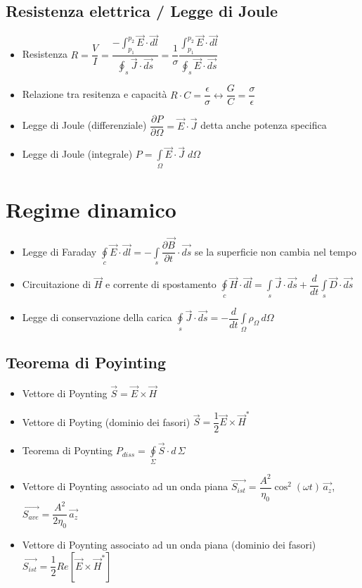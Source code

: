 \documentclass{article}
\begin{document}
\subsection{Resistenza elettrica / Legge di Joule}
\begin{itemize}
	\item Resistenza \(\displaystyle  R = \dfrac{V}{I} = \dfrac{\displaystyle-\int_{p_1}^{p_2} \vec{E} \cdot \vec{dl}}{\displaystyle\oint_s \vec{J} \cdot \vec{ds}} = \dfrac{1}{\sigma} \dfrac{\displaystyle\int_{p_1}^{p_2} \vec{E} \cdot \vec{dl}}{\displaystyle \oint_s \vec{E} \cdot \vec{ds}} \)
	\item Relazione tra resitenza e capacità \(R \cdot C = \dfrac{\epsilon}{\sigma} \leftrightarrow \dfrac{G}{C} = \dfrac{\sigma}{\epsilon} \)
	\item Legge di Joule (differenziale) \( \dfrac{\partial P}{\partial \Omega} = \vec{E} \cdot \vec{J} \) detta anche potenza specifica
	\item Legge di Joule (integrale) \(\displaystyle P = \int\limits_\Omega \vec{E} \cdot \vec{J} \; d\Omega \)
\end{itemize}

\newpage

\section{Regime dinamico}
\begin{itemize}
	\item Legge di Faraday \(\displaystyle \oint\limits_c \vec{E} \cdot \vec{dl} = - \int\limits_s \dfrac{\partial \vec{B}}{\partial t} \cdot \vec{ds} \) se la superficie non cambia nel tempo
	\item Circuitazione di \( \vec{H} \) e corrente di spostamento \(\displaystyle \oint\limits_c \vec{H} \cdot \vec{dl} = \int\limits_s \vec{J} \cdot \vec{ds} + \dfrac{d}{dt} \int\limits_s \vec{D} \cdot \vec{ds} \)
	\item Legge di conservazione della carica \(\displaystyle \oint\limits_s \vec{J} \cdot \vec{ds} = -\dfrac{d}{dt} \int\limits_\Omega \rho_\Omega \, d\Omega \)
\end{itemize}

\subsection{Teorema di Poyinting}
\begin{itemize}
	\item Vettore di Poynting \( \vec{S} = \vec{E} \times \vec{H} \)
	\item Vettore di Poyting (dominio dei fasori) \( \vec{S} = \dfrac{1}{2} \vec{E} \times \vec{H}^{*} \)
	\item Teorema di Poynting \( P_{diss} = \oint\limits_\Sigma \vec{S} \cdot d \,\Sigma \)
	\item Vettore di Poynting associato ad un onda piana \( \vec{S_{ist}} = \dfrac{A^2}{\eta_0} \cos^2{(\omega t)} \, \vec{a_z} \), \( \vec{S_{ave}} = \dfrac{A^2}{2 \eta_0} \, \vec{a_z}\)
	\item Vettore di Poynting associato ad un onda piana (dominio dei fasori) \( \vec{S_{ist}} = \dfrac{1}{2} Re[\vec{E} \times \vec{H}^{*}] \)
\end{itemize}
\end{document}
